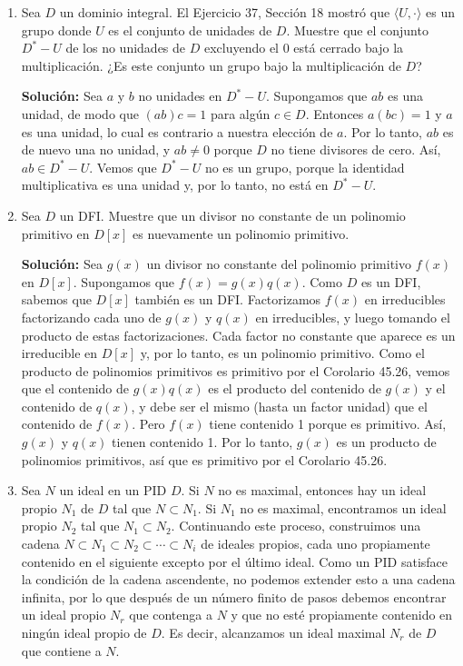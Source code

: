 \begin{enumerate}
    \item Sea \( D \) un dominio integral. El Ejercicio 37, Sección 18 mostró que \( \langle U, \cdot \rangle \) es un grupo donde \( U \) es el conjunto de unidades de \( D \). Muestre que el conjunto \( D^* - U \) de los no unidades de \( D \) excluyendo el 0 está cerrado bajo la multiplicación. ¿Es este conjunto un grupo bajo la multiplicación de \( D \)?
    
    \textbf{Solución:} Sea \( a \) y \( b \) no unidades en \( D^* - U \). Supongamos que \( ab \) es una unidad, de modo que \( (ab)c = 1 \) para algún \( c \in D \). Entonces \( a(bc) = 1 \) y \( a \) es una unidad, lo cual es contrario a nuestra elección de \( a \). Por lo tanto, \( ab \) es de nuevo una no unidad, y \( ab \neq 0 \) porque \( D \) no tiene divisores de cero. Así, \( ab \in D^* - U \). Vemos que \( D^* - U \) no es un grupo, porque la identidad multiplicativa es una unidad y, por lo tanto, no está en \( D^* - U \).

    \item Sea \( D \) un DFI. Muestre que un divisor no constante de un polinomio primitivo en \( D[x] \) es nuevamente un polinomio primitivo.
    
    \textbf{Solución:} Sea \( g(x) \) un divisor no constante del polinomio primitivo \( f(x) \) en \( D[x] \). Supongamos que \( f(x) = g(x)q(x) \). Como \( D \) es un DFI, sabemos que \( D[x] \) también es un DFI. Factorizamos \( f(x) \) en irreducibles factorizando cada uno de \( g(x) \) y \( q(x) \) en irreducibles, y luego tomando el producto de estas factorizaciones. Cada factor no constante que aparece es un irreducible en \( D[x] \) y, por lo tanto, es un polinomio primitivo. Como el producto de polinomios primitivos es primitivo por el Corolario 45.26, vemos que el contenido de \( g(x)q(x) \) es el producto del contenido de \( g(x) \) y el contenido de \( q(x) \), y debe ser el mismo (hasta un factor unidad) que el contenido de \( f(x) \). Pero \( f(x) \) tiene contenido 1 porque es primitivo. Así, \( g(x) \) y \( q(x) \) tienen contenido 1. Por lo tanto, \( g(x) \) es un producto de polinomios primitivos, así que es primitivo por el Corolario 45.26.

    \item Sea \( N \) un ideal en un PID \( D \). Si \( N \) no es maximal, entonces hay un ideal propio \( N_1 \) de \( D \) tal que \( N \subset N_1 \). Si \( N_1 \) no es maximal, encontramos un ideal propio \( N_2 \) tal que \( N_1 \subset N_2 \). Continuando este proceso, construimos una cadena \( N \subset N_1 \subset N_2 \subset \cdots \subset N_i \) de ideales propios, cada uno propiamente contenido en el siguiente excepto por el último ideal. Como un PID satisface la condición de la cadena ascendente, no podemos extender esto a una cadena infinita, por lo que después de un número finito de pasos debemos encontrar un ideal propio \( N_r \) que contenga a \( N \) y que no esté propiamente contenido en ningún ideal propio de \( D \). Es decir, alcanzamos un ideal maximal \( N_r \) de \( D \) que contiene a \( N \).


\end{enumerate}
